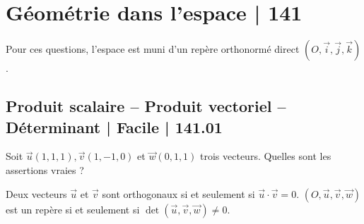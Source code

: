 

\section{Géométrie dans l'espace | 141}




Pour ces questions, l'espace est muni d'un repère orthonormé direct  $(O, \vec{i}, \vec{j}, \vec{k})$.

\subsection{Produit scalaire -- Produit vectoriel -- Déterminant | Facile | 141.01}

 
 
\begin{question}

Soit $\vec{u}(1,1,1), \vec{v}(1,-1,0)$ et $\vec{w}(0,1,1)$ trois vecteurs. Quelles sont les assertions vraies ?
\begin{answers}



\end{answers}
\begin{explanations}
Deux vecteurs $\vec{u}$ et $\vec{v}$ sont orthogonaux si et seulement si $ \vec{u} \cdot \vec{v}=0$.
 $(O,\vec{u},\vec{v},\vec{w})$ est un repère si et seulement si $\det (\vec{u},\vec{v},\vec{w}) \neq 0$.
\end{explanations}

\end{question}


